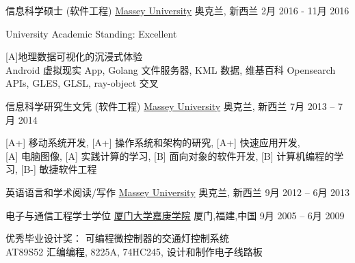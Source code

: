 
\begin{cventries}
\cventry
{信息科学硕士 (软件工程)}
{\href{http://www.massey.ac.nz/}{Massey University}}
{奥克兰, \enskip 新西兰}
{2月 2016 - 11月 2016}
{
	\begin{cvitems}
		\item{University Academic Standing: Excellent}
		\item {[A]地理数据可视化的沉浸式体验\\
			Android 虚拟现实 App, Golang 文件服务器, KML 数据, 维基百科 Opensearch APIs, GLES, GLSL, ray-object 交叉}
	\end{cvitems}
}
\end{cventries}

\begin{cventries}
	\cventry
	{信息科学研究生文凭 (软件工程)}
	{\href{http://www.massey.ac.nz/}{Massey University}}
	{奥克兰, \enskip 新西兰}
	{7月 2013 – 7月 2014}
	{
		\begin{cvitems}
			\item{[A+] 移动系统开发},\enskip
			{[A+] 操作系统和架构的研究},\enskip
			{[A+] 快速应用开发},\enskip\\
			{[A] 电脑图像},\enskip
			{[A] 实践计算的学习},\enskip
			{[B] 面向对象的软件开发},\enskip
			{[B] 计算机编程的学习},\enskip
			{[B-] 敏捷软件工程}\enskip
		\end{cvitems}
	}
\end{cventries}

\begin{cventries}
	\cventry
	{英语语言和学术阅读/写作}
	{\href{http://www.massey.ac.nz/}{Massey University}}
	{奥克兰, \enskip 新西兰}
	{9月 2012 – 6月 2013}
	{
		\begin{cvitems}
		\end{cvitems}
	}
\end{cventries}

\begin{cventries}
	\cventry
	{电子与通信工程学士学位}
	{\href{http://www.xmu.edu.cn/en/}{厦门大学嘉庚学院}}
	{厦门,\enskip 福建,\enskip 中国}
	{9月 2005 – 6月 2009}
	{
		\begin{cvitems}
			\item {优秀毕业设计奖： 可编程微控制器的交通灯控制系统\\
			AT89S52 汇编编程, 8225A, 74HC245, 设计和制作电子线路板}
		\end{cvitems}
	}
\end{cventries}

